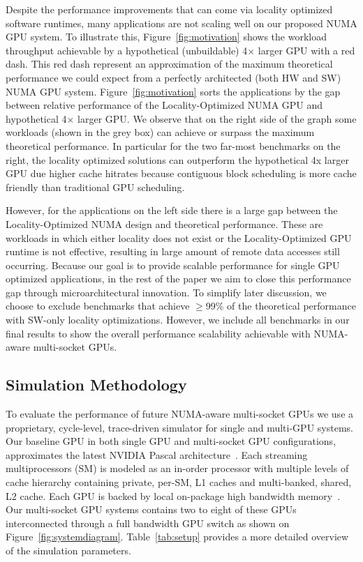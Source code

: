 Despite the performance improvements that can come via locality optimized 
software runtimes, many applications are not scaling well on our proposed NUMA 
GPU system. To illustrate this, Figure~\ref{fig:motivation} shows the workload 
throughput achievable by a hypothetical (unbuildable) 4$\times$ larger GPU with 
a red dash. This red dash represent an approximation of the 
maximum theoretical performance we could expect from a perfectly architected 
(both HW and SW) NUMA GPU system. Figure~\ref{fig:motivation} sorts the 
applications by the gap between relative performance of the Locality-Optimized 
NUMA GPU and hypothetical 4$\times$ larger GPU. We observe that on the right 
side of the graph some workloads (shown in the grey box) can achieve or surpass 
the maximum theoretical performance. In particular for the two far-most 
benchmarks on the right, the locality optimized solutions can outperform the 
hypothetical 4x larger GPU due higher cache hitrates because contiguous block 
scheduling is more cache friendly than traditional GPU scheduling.

However, for the applications on the left side there is a large gap between the 
Locality-Optimized NUMA design and theoretical performance. These are workloads 
in which either locality does not exist or the Locality-Optimized GPU runtime is 
not effective, resulting in large amount of remote data accesses still 
occurring.  Because our goal is to provide scalable performance for single GPU 
optimized applications, in the rest of the paper we aim to close this 
performance gap through microarchitectural innovation. To simplify later 
discussion, we choose to exclude benchmarks that achieve $\geq$99\% of the 
theoretical performance with SW-only locality optimizations. However, we include 
all benchmarks in our final results to show the overall performance scalability 
achievable with NUMA-aware multi-socket GPUs.
 
\subsection{Simulation Methodology}
\label{sec:methodology}

To evaluate the performance of future NUMA-aware multi-socket GPUs we use a 
proprietary, cycle-level, trace-driven simulator for single and multi-GPU 
systems. Our baseline GPU in both single GPU and multi-socket GPU 
configurations, approximates the latest NVIDIA Pascal 
architecture~\cite{pascal-tesla-wp}. Each streaming multiprocessors (SM) is 
modeled as an in-order processor with multiple levels of cache hierarchy 
containing private, per-SM, L1 caches and multi-banked, shared, L2 cache. Each 
GPU is backed by local on-package high bandwidth memory~\cite{HBM}. Our 
multi-socket GPU systems contains two to eight of these GPUs interconnected 
through a full bandwidth GPU switch as shown on Figure~\ref{fig:systemdiagram}. 
Table~\ref{tab:setup} provides a more detailed overview of the simulation 
parameters.


